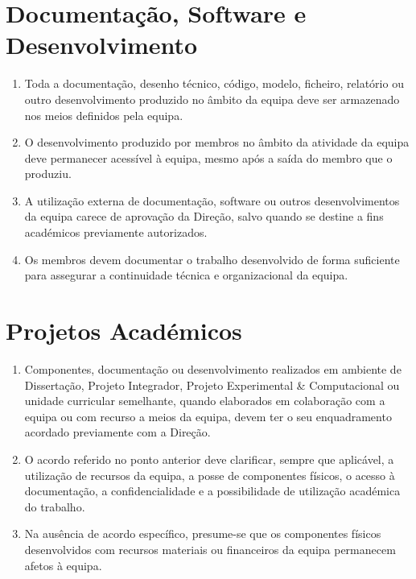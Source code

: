 \section{Documentação, Software e Desenvolvimento}
\begin{enumerate}
  \item Toda a documentação, desenho técnico, código, modelo, ficheiro, relatório ou outro desenvolvimento produzido no âmbito da equipa deve ser armazenado nos meios definidos pela equipa.
  \item O desenvolvimento produzido por membros no âmbito da atividade da equipa deve permanecer acessível à equipa, mesmo após a saída do membro que o produziu.
  \item A utilização externa de documentação, software ou outros desenvolvimentos da equipa carece de aprovação da Direção, salvo quando se destine a fins académicos previamente autorizados.
  \item Os membros devem documentar o trabalho desenvolvido de forma suficiente para assegurar a continuidade técnica e organizacional da equipa.
\end{enumerate}

\section{Projetos Académicos}
\begin{enumerate}
  \item Componentes, documentação ou desenvolvimento realizados em ambiente de Dissertação, Projeto Integrador, Projeto Experimental \& Computacional ou unidade curricular semelhante, quando elaborados em colaboração com a equipa ou com recurso a meios da equipa, devem ter o seu enquadramento acordado previamente com a Direção.
  \item O acordo referido no ponto anterior deve clarificar, sempre que aplicável, a utilização de recursos da equipa, a posse de componentes físicos, o acesso à documentação, a confidencialidade e a possibilidade de utilização académica do trabalho.
  \item Na ausência de acordo específico, presume-se que os componentes físicos desenvolvidos com recursos materiais ou financeiros da equipa permanecem afetos à equipa.
\end{enumerate}

